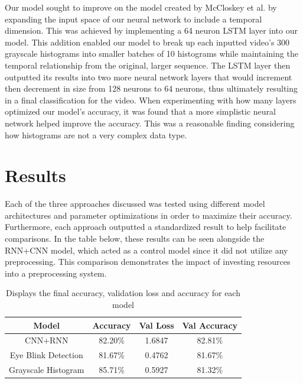 \documentclass[a4paper]{article}
\begin{document}
Our model sought to improve on the model created by McCloskey et al. \cite{Color_Cues} by expanding the input space of our neural network to include a temporal dimension. This was achieved by implementing a 64 neuron LSTM layer into our model. This addition enabled our model to break up each inputted video’s 300 grayscale histograms into smaller batches of 10 histograms while maintaining the temporal relationship from the original, larger sequence. The LSTM layer then outputted its results into two more neural network layers that would increment then decrement in size from 128 neurons to 64 neurons, thus ultimately resulting in a final classification for the video. When experimenting with how many layers optimized our model’s accuracy, it was found that a more simplistic neural network helped improve the accuracy. This was a reasonable finding considering how histograms are not a very complex data type.

\section{Results}

Each of the three approaches discussed was tested using different model architectures and parameter optimizations in order to maximize their accuracy. Furthermore, each approach outputted a standardized result to help facilitate comparisons. In the table below, these results can be seen alongside the RNN+CNN model, which acted as a control model since it did not utilize any preprocessing. This comparison demonstrates the impact of investing resources into a preprocessing system.

\begin{table}[ht]
\centering
\begin{tabular}{ |c|c|c|c| } 
\hline
Model & Accuracy & Val Loss & Val Accuracy \\
\hline
CNN+RNN & 82.20\% & 1.6847 & 82.81\% \\ 
\hline
Eye Blink Detection & 81.67\% & 0.4762 & 81.67\% \\ 
\hline
Grayscale Histogram & 85.71\% & 0.5927 & 81.32\% \\ 
\hline
\end{tabular}
\caption{Displays the final accuracy, validation loss and accuracy for each model}
\label{table:2}
\end{table}
\end{document}
